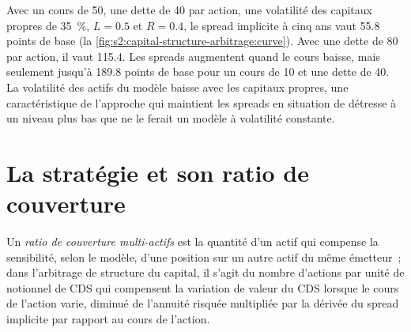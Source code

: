 Avec un cours de 50, une dette de 40 par action, une volatilité des capitaux propres de 35~\%, $L = 0.5$ et $R = 0.4$, le spread implicite à cinq ans vaut 55.8 points de base
(la \cref{fig:s2:capital-structure-arbitrage:curve}). Avec une dette de 80 par action, il vaut 115.4. Les spreads augmentent quand le cours baisse, mais seulement jusqu'à 189.8
points de base pour un cours de 10 et une dette de 40. La volatilité des actifs du modèle baisse avec les capitaux propres, une caractéristique de l'approche qui maintient les spreads en situation de détresse
à un niveau plus bas que ne le ferait un modèle à volatilité constante.

\begin{omfigure}

\label{fig:s2:capital-structure-arbitrage:curve}
\end{omfigure}

\section{La stratégie et son ratio de couverture}

\begin{definition}\label{def:s2:capital-structure-arbitrage:hedge}
Un \emph{ratio de couverture multi-actifs} est la quantité d'un actif qui compense la sensibilité, selon le modèle, d'une position sur
un autre actif du même émetteur~; dans l'arbitrage de structure du capital, il s'agit du nombre d'actions par unité de notionnel de CDS qui compensent la variation de valeur du CDS lorsque le
cours de l'action varie, diminué de l'annuité risquée multipliée par la dérivée du spread implicite par rapport au cours de l'action.
\end{definition}

